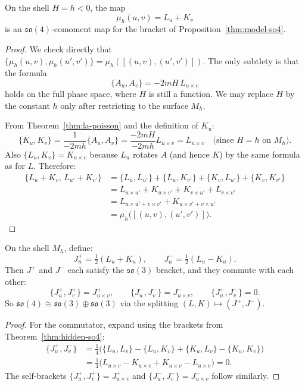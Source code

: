 \begin{theorem}\label{thm:hidden-so4}
On the shell $H = h < 0$, the map
\[
  \mu_h(u, v) = L_u + K_v
\]
is an $\mathfrak{so}(4)$-comoment map for the bracket of Proposition~\ref{thm:model-so4}.
\leanok
\begin{proof}
We check directly that $\{\mu_h(u,v), \mu_h(u',v')\} = \mu_h([(u,v),(u',v')])$.
The only subtlety is that the formula
\[
  \{A_u, A_v\} = -2mH\,L_{u \times v}
\]
holds on the full phase space, where $H$ is still a function.
We may replace $H$ by the constant $h$ only after restricting to the surface $M_h$.

From Theorem~\ref{thm:la-poisson} and the definition of $K_u$:
\[
  \{K_u, K_v\}
  = \frac{1}{-2mh}\{A_u, A_v\}
  = \frac{-2mH}{-2mh}L_{u \times v}
  = L_{u \times v}
  \quad \text{(since $H = h$ on $M_h$)}.
\]
Also $\{L_u, K_v\} = K_{u \times v}$ because $L_u$ rotates $A$ (and hence $K$) by the same formula as for $L$.
Therefore:
\begin{align*}
  \{L_u + K_v,\, L_{u'} + K_{v'}\}
  &= \{L_u, L_{u'}\} + \{L_u, K_{v'}\} + \{K_v, L_{u'}\} + \{K_v, K_{v'}\} \\
  &= L_{u \times u'} + K_{u \times v'} + K_{v \times u'} + L_{v \times v'} \\
  &= L_{u \times u' + v \times v'} + K_{u \times v' + v \times u'} \\
  &= \mu_h\bigl([(u,v),(u',v')]\bigr).
\end{align*}
\end{proof}
\end{theorem}

\begin{corollary}\label{thm:two-so3}
On the shell $M_h$, define:
\[
  J^+_u = \tfrac{1}{2}(L_u + K_u),
  \qquad
  J^-_u = \tfrac{1}{2}(L_u - K_u).
\]
Then $J^+$ and $J^-$ each satisfy the $\mathfrak{so}(3)$ bracket, and they commute with each other:
\[
  \{J^+_u, J^+_v\} = J^+_{u \times v},
  \qquad
  \{J^-_u, J^-_v\} = J^-_{u \times v},
  \qquad
  \{J^+_u, J^-_v\} = 0.
\]
So $\mathfrak{so}(4) \cong \mathfrak{so}(3) \oplus \mathfrak{so}(3)$ via the splitting $(L, K) \mapsto (J^+, J^-)$.
\leanok
\begin{proof}
For the commutator, expand using the brackets from Theorem~\ref{thm:hidden-so4}:
\begin{align*}
  \{J^+_u, J^-_v\}
  &= \tfrac{1}{4}\bigl(\{L_u, L_v\} - \{L_u, K_v\} + \{K_u, L_v\} - \{K_u, K_v\}\bigr) \\
  &= \tfrac{1}{4}\bigl(L_{u \times v} - K_{u \times v} + K_{u \times v} - L_{u \times v}\bigr)
   = 0.
\end{align*}
The self-brackets $\{J^+_u, J^+_v\} = J^+_{u \times v}$ and $\{J^-_u, J^-_v\} = J^-_{u \times v}$ follow similarly.
\end{proof}
\end{corollary}


